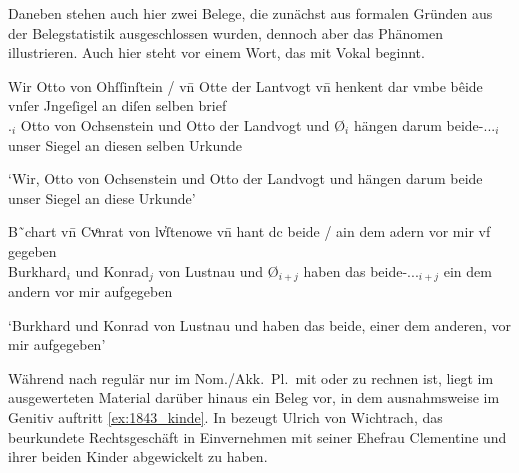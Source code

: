 Daneben stehen auch hier zwei Belege, die zunächst aus formalen Gründen aus der
Beleg\-statistik ausgeschlossen wurden, dennoch aber das Phänomen illustrieren.
Auch hier steht  vor einem Wort, das mit Vokal beginnt.

\begin{exe}
\ex \label{ex:vvfinctrl2}
	\begin{xlist}
	\ex \label{ex:vvfinctrl2_1}
		\gll Wir Otto von Ohſſinſtein / vn̄ Otte der Lantvogt
				\textelp{} vn̄ {} henkent {dar vmbe} bêide vnſer
				Jngeſigel an diſen selben brief \\
			\Tpl\subM.\Nom{}$_i$ Otto von Ochsenstein {} und Otto der Landvogt
				{} und Ø$_i$ hängen darum beide-\Nom.\Pl.\MascM.\St{}$_i$ unser
				Siegel an diesen selben Urkunde \\
		\begin{taggedline}{\parencites(Burg Ochsenstein, Dépt.~Bas-Rhin, 1289)[\pno~1145, 427.5--6]{cao2}}
		\trans `Wir, Otto von Ochsenstein und Otto der Landvogt \textelp{}
			und  hängen darum beide unser Siegel an diese Urkunde'
		\end{taggedline}

	\ex \label{ex:vvfinctrl2_2}
		\gll B˜chart vn̄ Cvͦnrat von lv̓ſtenowe
				\textelp{} vn̄ {} hant dc beide / ain dem
				adern vor mir {vf gegeben} \\				
			Burkhard$_i$ und Konrad$_j$ von Lustnau {} und Ø$_{i+j}$ haben das
				beide-\Nom.\Pl.\MascM.\St{}$_{i+j}$ {} ein dem andern vor mir
				aufgegeben \\
		\begin{taggedline}{\parencites(Tübingen, 1297)[\pno~2607, 32.41--33.1]{cao4}}
		\trans `Burkhard und Konrad von Lustnau \textelp{} und
			 haben das beide, einer dem anderen, vor mir
			aufgegeben'
		\end{taggedline}
	\end{xlist}
\end{exe}

\label{phsec:beidegen}
Während nach \citet[623]{ksw2} regulär nur im Nom./Akk.~Pl.\ mit 
oder  zu rechnen ist, liegt im ausgewerteten Material darüber
hinaus ein Beleg vor, in dem  ausnahmsweise im Genitiv auftritt
\cref{ex:1843_kinde}. In  \autocite{cao3} bezeugt
Ulrich von Wichtrach, das beurkundete Rechtsgeschäft in Einvernehmen mit seiner
Ehefrau Clementine und ihrer beiden Kinder abgewickelt zu haben.

